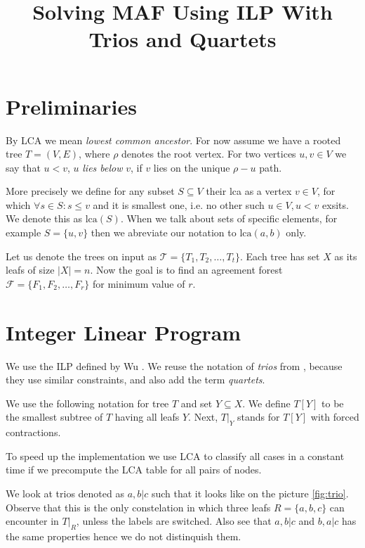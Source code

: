 \documentclass{article}
\title{Solving MAF Using ILP With Trios and Quartets}
\author{}
\date{}
\theoremstyle{plain}
\theoremstyle{definition}
\newcommand{\lca}{\mathrm{lca}}
\begin{document}
  \maketitle

  \section{Preliminaries}

  By LCA we mean \emph{lowest common ancestor}. For now assume we have a rooted tree $T = (V,E)$, where
  $\rho$ denotes the root vertex. For two vertices $u, v \in V$ we say that $u < v$, $u$ \emph{lies below} $v$,
  if $v$ lies on the unique $\rho-u$ path.

  More precisely we define for any subset $S \subseteq V$ their lca as a vertex $v \in V$, for which
  $\forall s \in S: s \leq v$ and it is smallest one, i.e. no other such $u \in V, u < v$ exsits.
  We denote this as $\lca(S)$. When we talk about sets of specific elements, for example
  $S = \{u,v\}$ then we abreviate our notation to $\lca(a,b)$ only.

  Let us denote the trees on input as $\mathcal{T} = \{T_1, T_2, \dots, T_t\}$. Each tree has set $X$
  as its leafs of size $|X| = n$. Now the goal is to find an agreement forest
  $\mathcal{F} = \{F_1, F_2, \dots, F_r\}$ for minimum value of $r$.

  \section{Integer Linear Program}

  We use the ILP defined by Wu \cite{wuPracticalMethodExact2009}. We reuse the notation of \emph{trios} from
  \cite{ilp-maf}, because they use similar constraints, and also add the term \emph{quartets}.

  We use the following notation for tree $T$ and set $Y \subseteq X$. We define
  $T[Y]$ to be the smallest subtree of $T$ having all leafs $Y$.
  Next, $T|_Y$ stands for $T[Y]$ with forced contractions.

  To speed up the implementation we use LCA to classify all cases
  in a constant time if we precompute the LCA table for all pairs of nodes.

  We look at trios denoted as $a,b|c$ such that it looks like on the picture \ref{fig:trio}.
  Observe that this is the only constelation in which three leafs $R = \{a,b,c\}$ can encounter
  in $T|_R$, unless the labels are switched. Also see that $a,b|c$ and $b,a|c$ has the
  same properties hence we do not distinquish them.
\end{document}
